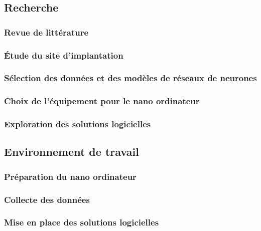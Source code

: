 \subsection{Recherche}

\subsubsection{Revue de littérature}

\subsubsection{Étude du site d'implantation}

\subsubsection{Sélection des données et des modèles de réseaux de neurones}

\subsubsection{Choix de l'équipement pour le nano ordinateur}

\subsubsection{Exploration des solutions logicielles}

\subsection{Environnement de travail}

\subsubsection{Préparation du nano ordinateur}

\subsubsection{Collecte des données}
\label{section:collecte_donnees}
\subsubsection{Mise en place des solutions logicielles}

